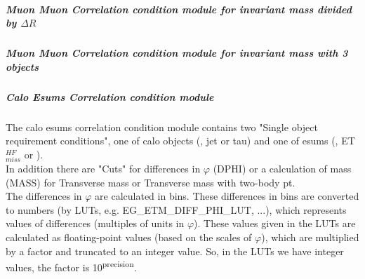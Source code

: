 
\subparagraph{Muon Muon Correlation condition module for invariant mass divided by $\Delta$$R$}
\label{sec:gtl:muon_muon_correlation_condition_module_mass_div_dr}

\subparagraph{Muon Muon Correlation condition module for invariant mass with 3 objects}
\label{sec:gtl:muon_muon_correlation_condition_module_mass_3_obj}

\subparagraph{Calo Esums Correlation condition module}
\label{sec:gtl:calo_esums_correlation_condition_module}

The calo esums correlation condition module contains two "Single object requirement conditions", one of calo objects (\egamma, jet or tau) and one of esums (\etm, ET$_{miss}^{HF}$ or \htm).\\
In addition there are "Cuts" for differences in $\varphi$ (DPHI) or a calculation of mass (MASS) for Transverse mass or Transverse mass with two-body pt.\\
The differences in $\varphi$ are calculated in bins. 
These differences in bins are converted to numbers (by LUTs, e.g. \small{EG\_ETM\_DIFF\_PHI\_LUT}\normalsize, ...),
which represents values of differences (multiples of units in $\varphi$).
These values given in the LUTs are calculated as floating-point values (based on the scales of $\varphi$), which are multiplied by a factor and truncated to an integer value.
So, in the LUTs we have integer values, the factor is 10\textsuperscript{\tiny{precision}\normalsize}.\\

